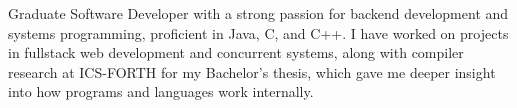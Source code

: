 

\begin{cvparagraph}
Graduate Software Developer with a strong passion for backend development and systems programming, proficient in Java, C, and C++. I have worked on projects in fullstack web development and concurrent systems, along with compiler research at ICS-FORTH for my Bachelor’s thesis, which gave me deeper insight into how programs and languages work internally.\end{cvparagraph}

